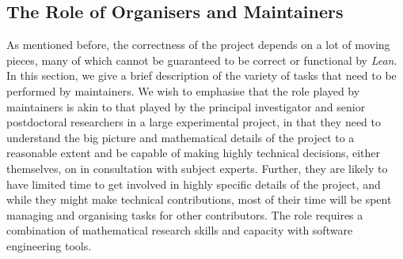 \subsection{The Role of Organisers and Maintainers}
As mentioned before, the correctness of the project depends on a lot of moving pieces, many of which cannot be guaranteed to be correct or functional by \emph{Lean}. In this section, we give a brief description of the variety of tasks that need to be performed by maintainers. We wish to emphasise that the role played by maintainers is akin to that played by the principal investigator and senior postdoctoral researchers in a large experimental project, in that they need to understand the big picture and mathematical details of the project to a reasonable extent and be capable of making highly technical decisions, either themselves, on in consultation with subject experts. Further, they are likely to have limited time to get involved in highly specific details of the project, and while they might make technical contributions, most of their time will be spent managing and organising tasks for other contributors. The role requires a  combination of mathematical research skills and capacity with software engineering tools.

